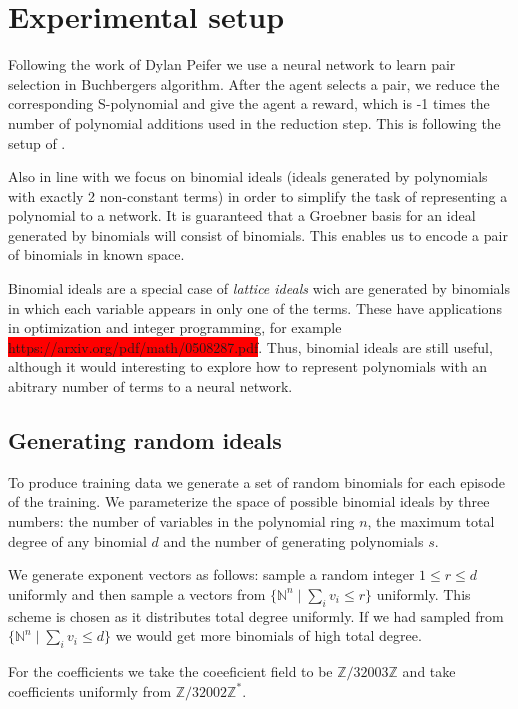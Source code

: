 \documentclass{article}
\theoremstyle{changedot}
\theoremstyle{changedotbreak}
\theoremstyle{nonumberplain}
\newcommand{\m}{\mathbb}
\begin{document}
\section{Experimental setup}
Following the work of Dylan Peifer \cite{peifer} we use a neural network to learn pair selection in Buchbergers algorithm. After the agent selects a pair, we reduce the corresponding S-polynomial and give the agent a reward, which is -1 times the number of polynomial additions used in the reduction step. This is following the setup of \cite{peifer}.

Also in line with \cite{peifer} we focus on binomial ideals (ideals generated by polynomials with exactly 2 non-constant terms) in order to simplify the task of representing a polynomial to a network. It is guaranteed that a Groebner basis for an ideal generated by binomials will consist of binomials. This enables us to encode a pair of binomials in known space.

Binomial ideals are a special case of \emph{lattice ideals} wich are generated by binomials in which each variable appears in only one of the terms. These have applications in optimization and integer programming, for example \colorbox{red}{https://arxiv.org/pdf/math/0508287.pdf}. Thus, binomial ideals are still useful, although it would interesting to explore how to represent polynomials with an abitrary number of terms to a neural network.

\subsection{Generating random ideals}
To produce training data we generate a set of random binomials for each episode of the training. We parameterize the space of possible binomial ideals by three numbers: the number of variables in the polynomial ring $n$, the maximum total degree of any binomial $d$ and the number of generating polynomials $s$.

We generate exponent vectors as follows: sample a random integer $1 \leq r \leq d$ uniformly and then sample a vectors from $\{\m N^{n} \mid \sum_{i} v_{i} \leq r\}$ uniformly. This scheme is chosen as it distributes total degree uniformly. If we had sampled from $\{\m N^{n} \mid \sum_{i} v_{i} \leq d\}$ we would get more binomials of high total degree.

For the coefficients we take the coeeficient field to be $\m Z / 32003 \m Z$ and take coefficients uniformly from $\m Z / 32002\m Z ^{*}$. 
\end{document}
